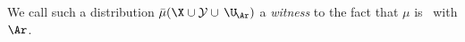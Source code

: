 \begin{defn}[\scibility]
We call such a distribution
$\bar\mu(\X \cup \mathcal Y \cup\, \U_{\!\Ar})$
 a \emph{witness}
    to the fact that $\mu$ is \scible\ with $\Ar$.
\end{defn}

